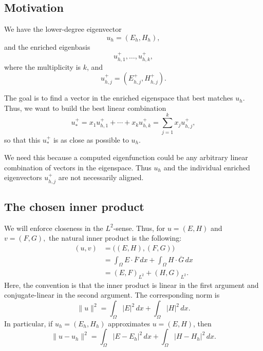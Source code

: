\documentclass[12pt,a4paper]{article}
\begin{document}
\subsection{Motivation}

We have the lower-degree eigenvector
\begin{equation}
    u_h = (E_h,H_h),
\end{equation}
and the enriched eigenbasis
\begin{equation}
    u^+_{h,1},\ldots,u^+_{h,k},
\end{equation}
where the multiplicity is \(k\), and
\begin{equation}
    u^+_{h,j} = (E^+_{h,j},H^+_{h,j}).
\end{equation}

The goal is to find a vector in the enriched eigenspace that best matches \(u_h\). Thus, we want to build the best linear combination
\begin{equation}
    u^+_* = x_1 u^+_{h,1} + \cdots + x_k u^+_{h,k}
           = \sum_{j=1}^k x_j u^+_{h,j},
\end{equation}
so that this \(u^+_*\) is as close as possible to \(u_h\).

We need this because a computed eigenfunction could be any arbitrary linear combination of vectors in the eigenspace. Thus \(u_h\) and the individual enriched eigenvectors \(u^+_{h,j}\) are not necessarily aligned.

\subsection{The chosen inner product}

We will enforce closeness in the \(L^2\)-sense. Thus, for  $u = (E,H)$ and $ v=(F,G),$ the natural inner product is the following:
\begin{equation}
\begin{aligned}
    (u,v)
    &= \bigl( (E,H),(F,G) \bigr) \\
    &= \int_{\Omega} E \cdot \overline{F}\,dx
       + \int_{\Omega} H \cdot \overline{G}\,dx \\
    &= (E,F)_{L^2}+ (H,G)_{L^2} .
\end{aligned}
\end{equation}
Here, the convention is that the inner product is linear in the first argument and conjugate-linear in the second argument. The corresponding norm is
\begin{equation}
    \|u\|^2
    = \int_{\Omega} |E|^2\,dx
      + \int_{\Omega} |H|^2\,dx.
\end{equation}
In particular, if $u_h = (E_h, H_h)$ approximates \(u=(E,H)\), then
\begin{equation}
    \|u-u_h\|^2
    = \int_{\Omega} |E-E_h|^2\,dx
      + \int_{\Omega} |H-H_h|^2\,dx.
\end{equation}
\end{document}
